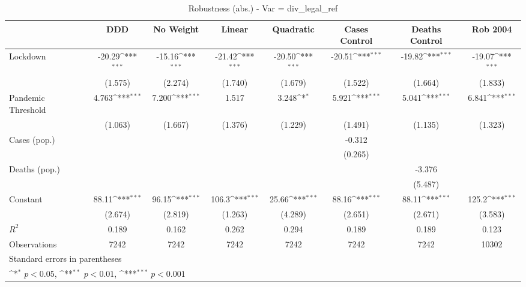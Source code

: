\documentclass{article}
\begin{document}
{
\def\sym#1{\ifmmode^{#1}\else\(^{#1}\)\fi}
\begin{longtable}{l*{7}{c}}
\caption{Robustness (abs.) - Var = div\_legal\_ref}\\
\hline\hline\endfirsthead\hline\endhead\hline\endfoot\endlastfoot
                &\multicolumn{1}{c}{DDD}&\multicolumn{1}{c}{No Weight}&\multicolumn{1}{c}{Linear}&\multicolumn{1}{c}{Quadratic}&\multicolumn{1}{c}{Cases Control}&\multicolumn{1}{c}{Deaths Control}&\multicolumn{1}{c}{Rob 2004}\\
\hline
Lockdown        &   -20.29\sym{***}&   -15.16\sym{***}&   -21.42\sym{***}&   -20.50\sym{***}&   -20.51\sym{***}&   -19.82\sym{***}&   -19.07\sym{***}\\
                &  (1.575)         &  (2.274)         &  (1.740)         &  (1.679)         &  (1.522)         &  (1.664)         &  (1.833)         \\
Pandemic Threshold&    4.763\sym{***}&    7.200\sym{***}&    1.517         &    3.248\sym{*}  &    5.921\sym{***}&    5.041\sym{***}&    6.841\sym{***}\\
                &  (1.063)         &  (1.667)         &  (1.376)         &  (1.229)         &  (1.491)         &  (1.135)         &  (1.323)         \\
Cases (pop.)    &                  &                  &                  &                  &   -0.312         &                  &                  \\
                &                  &                  &                  &                  &  (0.265)         &                  &                  \\
Deaths (pop.)   &                  &                  &                  &                  &                  &   -3.376         &                  \\
                &                  &                  &                  &                  &                  &  (5.487)         &                  \\
Constant        &    88.11\sym{***}&    96.15\sym{***}&    106.3\sym{***}&    25.66\sym{***}&    88.16\sym{***}&    88.11\sym{***}&    125.2\sym{***}\\
                &  (2.674)         &  (2.819)         &  (1.263)         &  (4.289)         &  (2.651)         &  (2.671)         &  (3.583)         \\
\hline
\(R^{2}\)       &    0.189         &    0.162         &    0.262         &    0.294         &    0.189         &    0.189         &    0.123         \\
Observations    &     7242         &     7242         &     7242         &     7242         &     7242         &     7242         &    10302         \\
\hline\hline
\multicolumn{8}{l}{\footnotesize Standard errors in parentheses}\\
\multicolumn{8}{l}{\footnotesize \sym{*} \(p<0.05\), \sym{**} \(p<0.01\), \sym{***} \(p<0.001\)}\\
\end{longtable}
}
\end{document}
